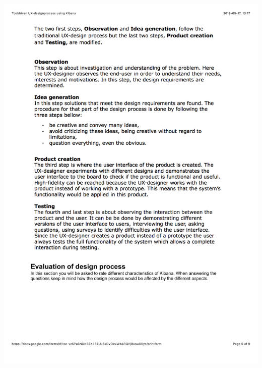 \documentclass[12pt]{kththesis}
\begin{document}
\begin{appendices}
\includegraphics[width=1\textwidth]{UX_designprocess5.pdf}

\end{appendices}
\end{document}
